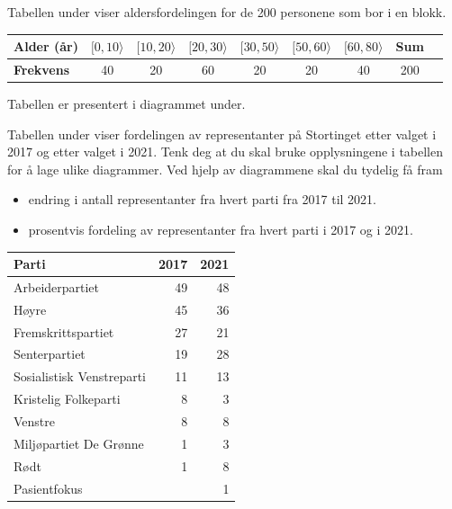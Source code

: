 \newpage
{}
Tabellen under viser aldersfordelingen for de 200 personene som bor i en blokk. 
\begin{center}
	\small
	\begin{tabular}{|l|c|c|c|c|c|c|c|c|}
		\hline
		\textbf{Alder (år)} & $[0,10\rangle$ & $[10,20\rangle$ & $[20,30\rangle$ & $[30,50\rangle$ & $[50,60\rangle$ & $[60,80\rangle$ & \textbf{Sum} \\
		\hline
		\textbf{Frekvens}   & 40       & 20        & 60        & 20        & 20        & 40        & 200 \\
		\hline
	\end{tabular}
\end{center}
Tabellen er presentert i diagrammet under.


Tabellen under viser fordelingen av representanter på Stortinget etter valget i 2017
og etter valget i 2021.
Tenk deg at du skal bruke opplysningene i tabellen for å lage ulike diagrammer.
Ved hjelp av diagrammene skal du tydelig få fram
\begin{itemize}
	\item endring i antall representanter fra hvert parti fra 2017 til 2021.
	\item prosentvis fordeling av representanter fra hvert parti i 2017 og i 2021.
\end{itemize}
\begin{center}
	\begin{tabular}{lrr}
		\textbf{Parti} & \textbf{2017} & \textbf{2021} \\
		\hline
		Arbeiderpartiet           & 49 & 48 \\
		Høyre                     & 45 & 36 \\
		Fremskrittspartiet        & 27 & 21 \\
		Senterpartiet             & 19 & 28 \\
		Sosialistisk Venstreparti & 11 & 13 \\
		Kristelig Folkeparti      &  8 &  3 \\
		Venstre                   &  8 &  8 \\
		Miljøpartiet De Grønne   &  1 &  3 \\
		Rødt                      &  1 &  8 \\
		Pasientfokus              &    &  1 \\
	\end{tabular}
\end{center}





